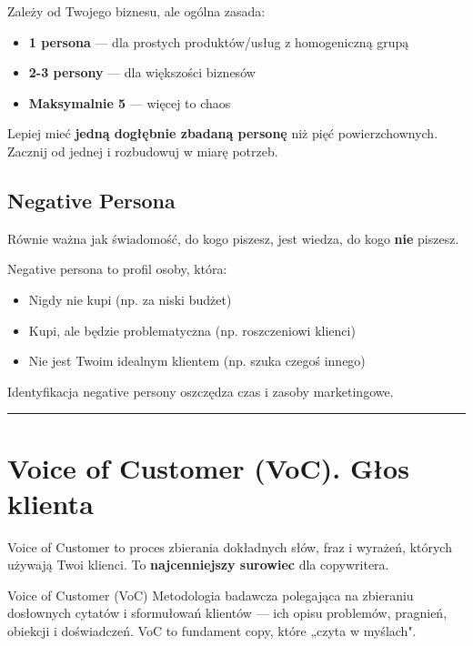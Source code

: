 \documentclass[
  12pt,
  a4paper,
  twoside,
  openright,
  12pt,
  DIV=12,
  BCOR=12mm]{scrbook}
\providecommand{\tightlist}{%
  \setlength{\itemsep}{0pt}\setlength{\parskip}{0pt}}\usepackage{longtable,booktabs,array}
\newcommand{\decoline}{%
  \begin{center}
    \textcolor{bordergray}{\rule{0.3\textwidth}{0.5pt}}
  \end{center}
}
\begin{document}
Zależy od Twojego biznesu, ale ogólna zasada:

\begin{itemize}
\tightlist
\item
  \textbf{1 persona} --- dla prostych produktów/usług z homogeniczną
  grupą
\item
  \textbf{2-3 persony} --- dla większości biznesów
\item
  \textbf{Maksymalnie 5} --- więcej to chaos
\end{itemize}

\begin{uwaga}
Lepiej mieć \textbf{jedną dogłębnie zbadaną personę} niż pięć powierzchownych. Zacznij od jednej i rozbudowuj w miarę potrzeb.
\end{uwaga}

\subsection{Negative Persona}\label{negative-persona}

Równie ważna jak świadomość, do kogo piszesz, jest wiedza, do kogo
\textbf{nie} piszesz.

Negative persona to profil osoby, która:

\begin{itemize}
\tightlist
\item
  Nigdy nie kupi (np. za niski budżet)
\item
  Kupi, ale będzie problematyczna (np. roszczeniowi klienci)
\item
  Nie jest Twoim idealnym klientem (np. szuka czegoś innego)
\end{itemize}

Identyfikacja negative persony oszczędza czas i zasoby marketingowe.

\decoline

\section{Voice of Customer (VoC). Głos
klienta}\label{voice-of-customer-voc.-gux142os-klienta}

Voice of Customer to proces zbierania dokładnych słów, fraz i wyrażeń,
których używają Twoi klienci. To \textbf{najcenniejszy surowiec} dla
copywritera.

\begin{pojecie}{Voice of Customer (VoC)}
Metodologia badawcza polegająca na zbieraniu dosłownych cytatów i sformułowań klientów --- ich opisu problemów, pragnień, obiekcji i doświadczeń. VoC to fundament copy, które „czyta w myślach".
\end{pojecie}
\end{document}

